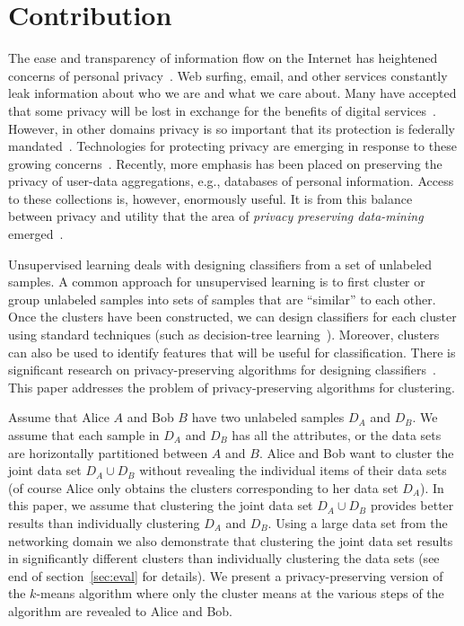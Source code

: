 
\section{Contribution}

The ease and transparency of information flow on the Internet has
heightened concerns of personal privacy~\cite{cra99,tur03}.  Web
surfing, email, and other services constantly leak information about
who we are and what we care about.  Many have accepted that some
privacy will be lost in exchange for the benefits of digital
services~\cite{tay03}.  However, in other domains privacy is so
important that its protection is federally mandated~\cite{hippa}.
Technologies for protecting privacy are
emerging in response to these growing
concerns~\cite{p3p02,gwb97,rks+97}.  Recently, more emphasis has been placed on preserving the
privacy of user-data aggregations, e.g., databases of personal
information.  Access to these  collections is, however, enormously
useful.  It is from this balance between privacy and utility that the
area of {\it privacy preserving data-mining}
emerged~\cite{Agrawal-Srikant,Lindell-Pinkas}.



Unsupervised learning deals with designing classifiers from a set of
unlabeled samples. A common approach for unsupervised learning is to
first cluster or group unlabeled samples into sets of samples that are
``similar'' to each other. Once the clusters have been constructed, we
can design classifiers for each cluster using standard techniques
(such as decision-tree
learning~\cite{Mitchell:AI,Quinlan:86}). Moreover, clusters can also
be used to identify features that will be useful for
classification. There is significant research on privacy-preserving
algorithms for designing
classifiers~\cite{Agrawal-Srikant,Lindell-Pinkas}. This paper
addresses the problem of privacy-preserving algorithms for clustering.



Assume that Alice $A$ and Bob $B$ have two unlabeled samples $D_A$ and
$D_B$. We assume that each sample in $D_A$ and $D_B$ has all the
attributes, or the data sets are horizontally partitioned between $A$
and $B$. Alice and Bob want to cluster the joint data set $D_A \cup
D_B$ without revealing the individual items of their data sets (of
course Alice only obtains the clusters corresponding to her data set
$D_A$). In this paper, we assume that clustering the joint data set
$D_A \cup D_B$ provides better results than individually clustering
$D_A$ and $D_B$.  Using a large data set from the networking domain we also demonstrate
that clustering the joint data set results in significantly different
clusters than individually clustering the data sets (see end of
section~\ref{sec:eval} for details). We present a privacy-preserving
version of the $k$-means algorithm where only the cluster means at the
various steps of the algorithm are revealed to Alice and Bob.



